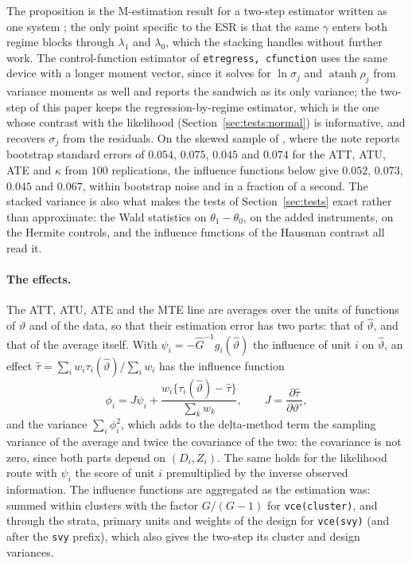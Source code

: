 \documentclass[11pt,a4paper]{article}
\theoremstyle{plain}
\theoremstyle{definition}
\theoremstyle{remark}
\newcommand{\1}{\mathbf{1}}
\newcommand{\cmd}[1]{\texttt{#1}}
\begin{document}
The proposition is the M-estimation result for a two-step estimator
written as one system \citep{newey1984, wooldridge2010}; the only point
specific to the ESR is that the same $\gamma$ enters both regime blocks
through $\lambda_1$ and $\lambda_0$, which the stacking handles without
further work. The control-function estimator of \cmd{etregress,
cfunction} uses the same device with a longer moment vector, since it
solves for $\ln\sigma_j$ and $\operatorname{atanh}\rho_j$ from variance
moments as well and reports the sandwich as its only variance; the
two-step of this paper keeps the regression-by-regime estimator, which
is the one whose contrast with the likelihood
(Section~\ref{sec:tests:normal}) is informative, and recovers
$\sigma_j$ from the residuals. On the skewed sample of \citet{araar2026msat}, where the
note reports bootstrap standard errors of $0.054$, $0.075$, $0.045$ and
$0.074$ for the ATT, ATU, ATE and $\kappa$ from $100$ replications,
the influence functions below give $0.052$, $0.073$, $0.045$ and $0.067$,
within bootstrap noise and in a fraction of a second. The stacked variance
is also what makes the tests of Section~\ref{sec:tests} exact rather than
approximate: the Wald statistics on $\theta_1-\theta_0$, on the added
instruments, on the Hermite controls, and the influence functions of the
Hausman contrast all read it.

\paragraph{The effects.}
The ATT, ATU, ATE and the MTE line are averages over the units of
functions of $\vartheta$ and of the data, so that their estimation error
has two parts: that of $\hat\vartheta$, and that of the average itself.
With $\psi_i=-\hat G^{-1}g_i(\hat\vartheta)$ the influence of unit $i$ on
$\hat\vartheta$, an effect $\hat\tau=\sum_iw_i\tau_i(\hat\vartheta)/\sum_iw_i$
has the influence function
\begin{equation}\label{eq:if:effects}
\phi_i=J\psi_i+\frac{w_i\{\tau_i(\hat\vartheta)-\hat\tau\}}{\sum_kw_k},\qquad
J=\frac{\partial\hat\tau}{\partial\vartheta'},
\end{equation}
and the variance $\sum_i\phi_i^2$, which adds to the delta-method term the
sampling variance of the average and twice the covariance of the two: the
covariance is not zero, since both parts depend on $(D_i,Z_i)$. The same
holds for the likelihood route with $\psi_i$ the score of unit $i$
premultiplied by the inverse observed information. The influence
functions are aggregated as the estimation was: summed within clusters
with the factor $G/(G-1)$ for \cmd{vce(cluster)}, and through the strata,
primary units and weights of the design for \cmd{vce(svy)} (and after the
\cmd{svy} prefix), which also gives the two-step its cluster and design
variances.
\end{document}
